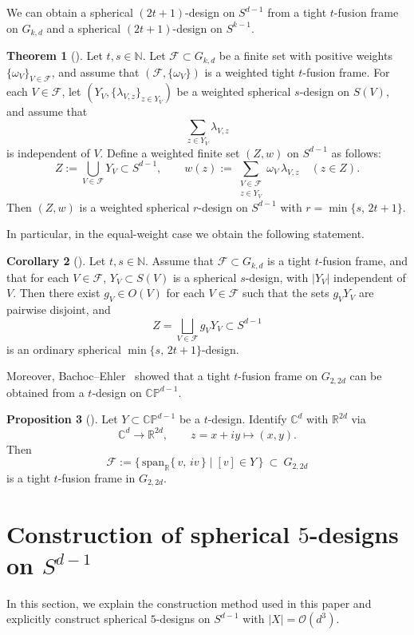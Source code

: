 \documentclass{amsart}
\theoremstyle{definition}
\newtheorem{theorem}{Theorem}[section]
\newtheorem{proposition}[theorem]{Proposition}
\newtheorem{corollary}[theorem]{Corollary}
\theoremstyle{remark}
\numberwithin{equation}{section}
\newcommand{\R}{{\mathbb R}}
\newcommand{\N}{{\mathbb N}}
\newcommand{\C}{{\mathbb C}}
\newcommand{\CP}{\mathbb{CP}}
\newcommand{\order}{\mathcal{O}}
\begin{document}
We can obtain a spherical $(2t+1)$-design on $S^{d-1}$ from a tight $t$-fusion frame on $G_{k,d}$ and a spherical $(2t+1)$-design on $S^{k-1}$.
\begin{theorem}[{\cite[Theorem~3.4]{Misawa2026}}]\label{thm:lifting-weighted}
Let $t,s\in\N$. Let $\mathcal{F}\subset G_{k,d}$ be a finite set with positive weights $\{\omega_V\}_{V\in \mathcal{F}}$, and assume that
$(\mathcal{F},\{\omega_V\})$ is a weighted tight $t$-fusion frame.
For each $V\in \mathcal{F}$, let $(Y_V,\{\lambda_{V,z}\}_{z\in Y_V})$ be a weighted spherical $s$-design on $S(V)$, and assume that
\[
\sum_{z\in Y_V}\lambda_{V,z}
\]
is independent of $V$.
Define a weighted finite set $(Z,w)$ on $S^{d-1}$ as follows:
\[
Z:=\bigcup_{V\in \mathcal{F}} Y_V \subset S^{d-1},
\qquad
w(z):=\sum_{\substack{V\in \mathcal{F}\\ z\in Y_V}}\omega_V\,\lambda_{V,z}\quad (z\in Z).
\]
Then $(Z,w)$ is a weighted spherical $r$-design on $S^{d-1}$ with
\(
r=\min\{s,\,2t+1\}.
\)
\end{theorem}
In particular, in the equal-weight case we obtain the following statement.
\begin{corollary}[{\cite[Corollary~3.5 \& Remark~3.6]{Misawa2026}}]\label{cor:lifting}
Let $t,s\in\N$.
Assume that $\mathcal{F}\subset G_{k,d}$ is a tight $t$-fusion frame, and that for each $V\in \mathcal{F}$,
$Y_V\subset S(V)$ is a spherical $s$-design, with $|Y_V|$ independent of $V$.
Then there exist $g_V\in O(V)$ for each $V\in \mathcal{F}$ such that the sets $g_VY_V$ are pairwise disjoint, and
\[
Z=\bigsqcup_{V\in \mathcal{F}} g_VY_V \subset S^{d-1}
\]
is an ordinary spherical $\min\{s,\,2t+1\}$-design.
\end{corollary}

Moreover, Bachoc--Ehler~\cite{BE2013} showed that a tight $t$-fusion frame on $G_{2,2d}$ can be obtained from a $t$-design on $\CP^{d-1}$.
\begin{proposition}[{\cite[Thm.~6.4]{BE2013}}]\label{prop:proj-to-ff}
Let $Y\subset \CP^{d-1}$ be a $t$-design.
Identify $\C^{d}$ with $\R^{2d}$ via
\[
\C^{d}\longrightarrow \R^{2d},\qquad
z=x+iy\longmapsto (x,y).
\]
Then
\[
\mathcal{F}:=\{\,\mathrm{span}_{\R}\{\,v,\,iv\,\}\mid [v]\in Y\,\}\ \subset\ G_{2,2d}
\]
is a tight $t$-fusion frame in $G_{2,2d}$.
\end{proposition}

\section{Construction of spherical $5$-designs on $S^{d-1}$}
In this section, we explain the construction method used in this paper and explicitly construct spherical $5$-designs on $S^{d-1}$ with
\(
|X|=\order(d^3).
\)
\end{document}
